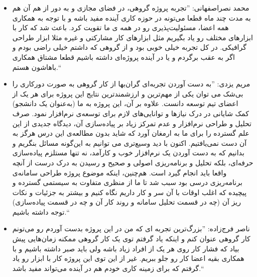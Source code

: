 \documentclass{report}
\begin{document}
\begin{itemize}
\item
محمد نصراصفهانی:
''تجربه پروژه گروهی، در فضای مجازی و به دور از هم آن هم به مدت چند ماه قطعا می‌تونه در حوزه کاری آینده مفید باشه و با توجه به همکاری همه اعضا، مسئولیت‌پذیری رو در همه ی ما تقویت کرد. باعث شد که کار با ابزارهای مختلف رو یاد بگیریم مثل ابزارهای کار مشارکتی و غیره مثلا ابزار طراحی گرافیکی. در کل تجربه خیلی خوبی بود و از گروهی که داشتم خیلی راضی بودم و اگر به عقب برگردم و یا در آینده پروژه‌ای داشته باشیم قطعا مشتاق همکاری باهاشون هستم.``
\item
مریم یزدی:
''به دست آوردن تجربه‌ای گران‌بها از کار گروهی به صورت دورکاری را بی‌شک می توان یکی از مهم‌ترین و ارزشمندترین نتایج این پروژه برای هر یک از اعضای تیم توسعه دانست. علاوه بر آن، این پروژه به ما (به‌عنوان یک دانشجو) کمک شایانی در درک نیازها و توانایی‌های لازم برای توسعه‌ی نرم‌افزار نمود. صرف تحلیل و طراحی نرم‌افزار و عدم تمرکز زیاد بر پیاده‌سازی  آن، دیدگاه جدیدی از این علم گسترده را برای ما به ارمغان آورد که شاید بدون مطالعه‌ی این درس هرگز به آن دست نمی‌یافتیم. اکنون با دید وسیع‌تری می توانیم به این‌گونه مسائل بنگریم و بدانیم که به دست آوردن یک نرم‌افزار خوب و کارآمد، نه تنها مستلزم پیاده‌سازی حرفه‌ای، بلکه تحلیل و برنامه‌ریزی اصولی و صحیح و رسیدن به درک درست از آنچه واقعا باید انجام گیرد است. هم‌چنین، اینکه موضوع پروژه طراحی سامانه‌ی برنامه‌ریزی درسی بود سبب شد تا ما از منظری متفاوت به سیستمی گسترده و پیچیده که اغلب اوقات با آن سر و کار داریم نگاه کنیم و بیشتر به جزئیات و نکات ریز آن (چه در قسمت تحلیل سامانه و روند کار آن و چه در قسمت پیاده‌سازی) توجه داشته باشیم.‍``
\item
ناصر فرج‌زاده:
''بزرگ‌ترین تجربه ای که من در این پروژه بدست آوردم رو می‌تونم کار گروهی عنوان کنم و اینکه یاد گرفتم توی یک کار گروهی ممکنه زمان‌هایی پیش بیاد که فشار کار روی هر یک از افراد زیاد باشه ولی باید صبر داشته باشیم و با همکاری بقیه اعضا کار رو جلو ببریم.
غیر از این توی این پروژه کار با ابزار 
 رو یاد گرفتم که برای زمینه کاری خودم هم در آینده می‌تواند مفید باشد.``

\end{itemize}
\end{document}
